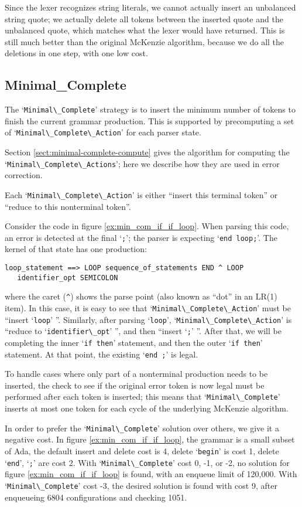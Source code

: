 \documentclass[authordraft]{acmart}
\newcommand{\code}[1]{`\lstinline|#1|'}
\begin{document}
Since the lexer recognizes string literals, we cannot actually insert
an unbalanced string quote; we actually delete all tokens between the
inserted quote and the unbalanced quote, which matches what the lexer
would have returned. This is still much better than the original
McKenzie algorithm, because we do all the deletions in one step, with
one low cost.

\subsection{Minimal\_Complete}
The \code{Minimal\_Complete} strategy is to insert the minimum number
of tokens to finish the current grammar production. This is supported
by precomputing a set of \code{Minimal\_Complete\_Action} for each
parser state.

Section \ref{sect:minimal-complete-compute} gives the algorithm for
computing the \code{Minimal\_Complete\_Actions}; here we describe how
they are used in error correction.

Each \code{Minimal\_Complete\_Action} is either ``insert this terminal
token'' or ``reduce to this nonterminal token''.

Consider the code in figure \ref{ex:min_com_if_if_loop}. When
parsing this code, an error is detected at the final \code{;}; the
parser is expecting \code{end loop;}. The kernel of that state has one
production:
\begin{verbatim}
loop_statement ==> LOOP sequence_of_statements END ^ LOOP
   identifier_opt SEMICOLON
\end{verbatim}
where the caret (\verb|^|) shows the parse point (also known as
``dot'' in an LR(1) item). In this case, it is easy to see that
\code{Minimal\_Complete\_Action} must be ``insert \code{loop} ''.
Similarly, after parsing \code{loop}, \code{Minimal\_Complete\_Action}
is ``reduce to \code{identifier\_opt} '', and then ``insert \code{;}
''. After that, we will be completing the inner \code{if then}
statement, and then the outer \code{if then} statement. At that point,
the existing \code{end ;} is legal.

To handle cases where only part of a nonterminal production needs to
be inserted, the check to see if the original error token is now legal
must be performed after each token is inserted; this means that
\code{Minimal\_Complete} inserts at most one token for each cycle of
the underlying McKenzie algorithm.

In order to prefer the \code{Minimal\_Complete} solution over others,
we give it a negative cost. In figure \ref{ex:min_com_if_if_loop}, the
grammar is a small subset of Ada, the
default insert and delete cost is 4, delete \code{begin} is cost 1,
delete \code{end}, \code{;} are cost 2. With \code{Minimal\_Complete}
cost 0, -1, or -2, no solution for figure \ref{ex:min_com_if_if_loop}
is found, with an enqueue limit of 120,000. With
\code{Minimal\_Complete} cost -3, the desired solution is found with
cost 9, after enqueueing 6804 configurations and checking 1051.
\end{document}
